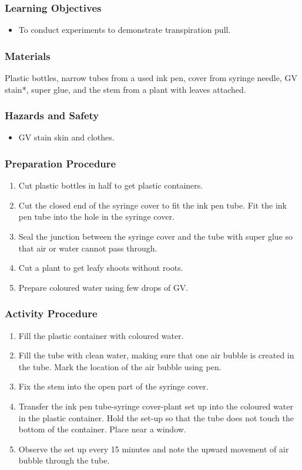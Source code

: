 \subsubsection*{Learning Objectives}
\begin{itemize}
\item{To conduct experiments to demonstrate transpiration pull.}
\end{itemize}


\subsubsection*{Materials}
Plastic bottles, narrow tubes from a used ink pen, cover from syringe needle, GV stain*, super glue, and the stem from a plant with leaves attached.

\subsubsection*{Hazards and Safety}
\begin{itemize}
\item{GV stain skin and clothes.}
\end{itemize}

\subsubsection*{Preparation Procedure}
\begin{enumerate}
\item{Cut plastic bottles in half to get plastic containers.}
\item{Cut the closed end of the syringe cover to fit the ink pen tube. Fit the ink pen tube into the hole in the syringe cover.}
\item{Seal the junction between the syringe cover and the tube with super glue so that air or water cannot pass through.}
\item{Cut a plant to get leafy shoots without roots.}
\item{Prepare coloured water using few drops of GV.}
\end{enumerate}

\subsubsection*{Activity Procedure}
\begin{enumerate}
\item{Fill the plastic container with coloured water.}
\item{Fill the tube with clean water, making sure that one air bubble is created in the tube. Mark the location of the air bubble using pen.}
\item{Fix the stem into the open part of the syringe cover.}
\item{Transfer the ink pen tube-syringe cover-plant set up into the coloured water in the plastic container. Hold the set-up so that the tube does not touch the bottom of the container. Place near a window.}
\item{Observe the set up every 15 minutes and note the upward movement of air bubble through the tube.}
\end{enumerate}

